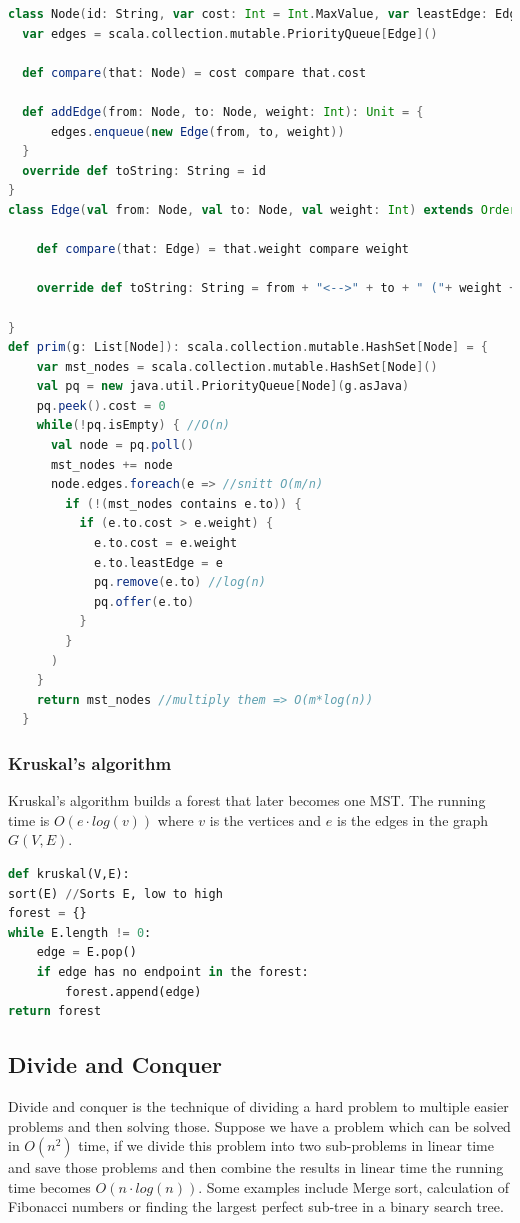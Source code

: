 \documentclass[12pt]{article} %
\begin{document}
\begin{lstlisting}[language=Scala, caption=Prim's in Scala]
class Node(id: String, var cost: Int = Int.MaxValue, var leastEdge: Edge = null) extends Ordered[Node]{
  var edges = scala.collection.mutable.PriorityQueue[Edge]()

  def compare(that: Node) = cost compare that.cost

  def addEdge(from: Node, to: Node, weight: Int): Unit = {
      edges.enqueue(new Edge(from, to, weight))
  }
  override def toString: String = id
}
class Edge(val from: Node, val to: Node, val weight: Int) extends Ordered[Edge]{

    def compare(that: Edge) = that.weight compare weight

    override def toString: String = from + "<-->" + to + " ("+ weight +")"

}
def prim(g: List[Node]): scala.collection.mutable.HashSet[Node] = {
    var mst_nodes = scala.collection.mutable.HashSet[Node]()
    val pq = new java.util.PriorityQueue[Node](g.asJava)
    pq.peek().cost = 0
    while(!pq.isEmpty) { //O(n)
      val node = pq.poll()
      mst_nodes += node
      node.edges.foreach(e => //snitt O(m/n)
        if (!(mst_nodes contains e.to)) {
          if (e.to.cost > e.weight) {
            e.to.cost = e.weight
            e.to.leastEdge = e
            pq.remove(e.to) //log(n)
            pq.offer(e.to)
          }
        }
      )
    }
    return mst_nodes //multiply them => O(m*log(n))
  }
\end{lstlisting}

\subsubsection{Kruskal's algorithm}
Kruskal's algorithm builds a forest that later becomes one MST. The running time is $O(e \cdot log(v))$ where $v$ is the vertices and $e$ is the edges in the graph $G(V, E)$. 

\begin{lstlisting}[language=Python, caption=Kruskal in python]
def kruskal(V,E):
sort(E) //Sorts E, low to high
forest = {}
while E.length != 0:
    edge = E.pop()
    if edge has no endpoint in the forest:
        forest.append(edge)
return forest
\end{lstlisting}

\subsection{Divide and Conquer}
Divide and conquer is the technique of dividing a hard problem to multiple easier problems and then solving those. Suppose we have a problem which can be solved in $O(n^2)$ time, if we divide this problem into two sub-problems in linear time and save those problems and then combine the results in linear time the running time becomes $O(n \cdot log(n))$. Some examples include Merge sort, calculation of Fibonacci numbers or finding the largest perfect sub-tree in a binary search tree.
\end{document}
